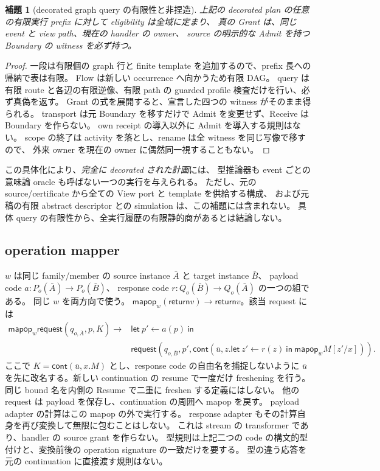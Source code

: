 \documentclass[11pt,a4paper]{article}
\newtheorem{lemma}[definition]{補題}
\newcommand{\Ret}{\mathsf{return}}
\newcommand{\Req}{\mathsf{request}}
\begin{document}
\begin{lemma}[decorated graph query の有限性と非捏造]
上記の decorated plan の任意の有限実行 prefix に対して eligibility は全域に定まり、
真の Grant は、同じ event と view path、現在の handler の owner、
source の明示的な Admit を持つ Boundary の witness を必ず持つ。
\end{lemma}
\begin{proof}
一段は有限個の graph 行と finite template を追加するので、prefix 長への帰納で表は有限。
Flow は新しい occurrence へ向かうため有限 DAG。
query は有限 route と各辺の有限逆像、有限 path の guarded profile 検査だけを行い、必ず真偽を返す。
Grant の式を展開すると、宣言した四つの witness がそのまま得られる。
transport は元 Boundary を移すだけで Admit を変更せず、Receive は Boundary を作らない。
own receipt の導入以外に Admit を導入する規則はない。
scope の終了は activity を落とし、rename は全 witness を同じ写像で移すので、
外来 owner を現在の owner に偶然同一視することもない。
\end{proof}

この具体化により、\emph{完全に decorated された計画}には、
型推論器も event ごとの意味論 oracle も呼ばない一つの実行を与えられる。
ただし、元の source/certificate から全ての View port と template を供給する構成、
および元稿の有限 abstract descriptor との simulation は、この補題には含まれない。
具体 query の有限性から、全実行履歴の有限静的商があるとは結論しない。

\subsection{operation mapper}

\(w\) は同じ family/member の source instance \(\bar A\) と target instance \(\bar B\)、
payload code \(a:P_o(\bar A)\to P_o(\bar B)\)、
response code \(r:Q_o(\bar B)\to Q_o(\bar A)\) の一つの組である。
同じ \(w\) を両方向で使う。
\(\mathsf{mapop}_w(\Ret v)\to\Ret v\)。該当 request には
\[
\begin{split}
 \mathsf{mapop}_w\Req(q_{o,\bar A},p,K)\longrightarrow{}&
 \mathsf{let}\ p'\leftarrow a(p)\ \mathsf{in}\\
 &
 \Req(q_{o,\bar B},p',\mathsf{cont}(\bar u,z.
    \mathsf{let}\ z'\leftarrow r(z)\ \mathsf{in}\
    \mathsf{mapop}_w M[z'/x])).
\end{split}
\]
ここで \(K=\mathsf{cont}(\bar u,x.M)\) とし、response code の自由名を捕捉しないように
\(\bar u\) を先に改名する。新しい continuation の resume で一度だけ freshening を行う。
同じ bound 名を内側の Resume で二重に freshen する定義にはしない。
他の request は payload を保存し、continuation の周囲へ mapop を戻す。
payload adapter の計算はこの mapop の外で実行する。
response adapter もその計算自身を再び変換して無限に包むことはしない。
これは stream の transformer であり、handler の source grant を作らない。
型規則は上記二つの code の構文的型付けと、変換前後の operation signature の一致だけを要する。
型の違う応答を元の continuation に直接渡す規則はない。
\end{document}
